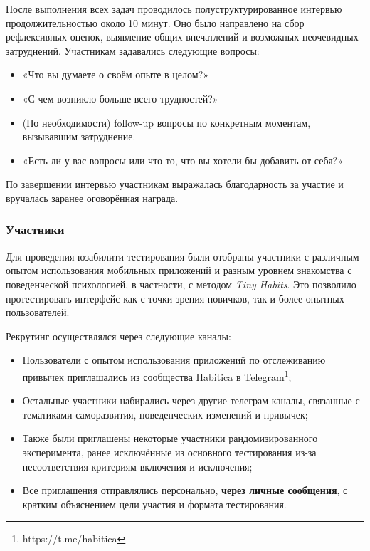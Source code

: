 \documentclass[pdflatex,sn-mathphys-num]{sn-jnl}%
\theoremstyle{thmstyleone}%
\theoremstyle{thmstyletwo}%
\theoremstyle{thmstylethree}%
\begin{document}
После выполнения всех задач проводилось полуструктурированное интервью продолжительностью около 10 минут. Оно было направлено на сбор рефлексивных оценок, выявление общих впечатлений и возможных неочевидных затруднений. Участникам задавались следующие вопросы:

\begin{itemize}
\item «Что вы думаете о своём опыте в целом?»
\item «С чем возникло больше всего трудностей?»
\item (По необходимости) follow-up вопросы по конкретным моментам, вызывавшим затруднение.
\item «Есть ли у вас вопросы или что-то, что вы хотели бы добавить от себя?»
\end{itemize}

По завершении интервью участникам выражалась благодарность за участие и вручалась заранее оговорённая награда.

\subsubsection{Участники}

Для проведения юзабилити-тестирования были отобраны участники с различным опытом использования мобильных приложений и разным уровнем знакомства с поведенческой психологией, в частности, с методом \textit{Tiny Habits}. Это позволило протестировать интерфейс как с точки зрения новичков, так и более опытных пользователей.

Рекрутинг осуществлялся через следующие каналы:

\begin{itemize}
\item Пользователи с опытом использования приложений по отслеживанию привычек приглашались из сообщества Habitica в Telegram\footnote{https://t.me/habitica};
\item Остальные участники набирались через другие телеграм-каналы, связанные с тематиками саморазвития, поведенческих изменений и привычек;
\item Также были приглашены некоторые участники рандомизированного эксперимента, ранее исключённые из основного тестирования из-за несоответствия критериям включения и исключения;
\item Все приглашения отправлялись персонально, \textbf{через личные сообщения}, с кратким объяснением цели участия и формата тестирования.
\end{itemize}
\end{document}
